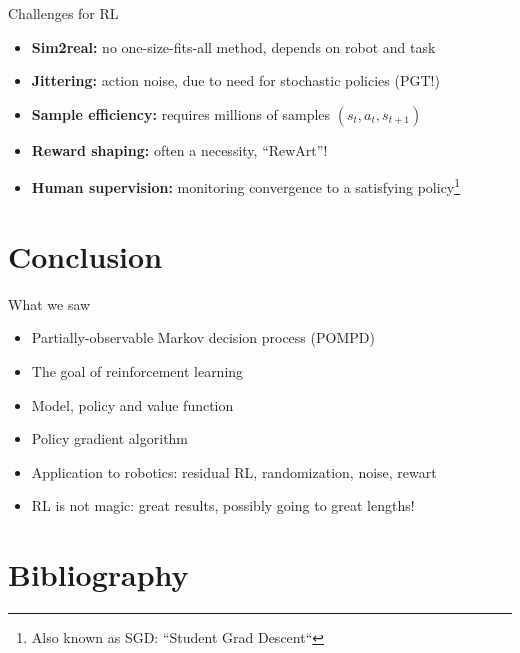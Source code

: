 \documentclass[11pt, aspectratio=169]{beamer}
\begin{document}

\begin{frame}{Challenges for RL}
    \begin{itemize}
        \item \textbf{Sim2real:} no one-size-fits-all method, depends on robot and task
        \item \textbf{Jittering:} action noise, due to need for stochastic policies (PGT!)
        \item \textbf{Sample efficiency:} requires millions of samples $(s_t, a_t, s_{t+1})$
        \item \textbf{Reward shaping:} often a necessity, ``RewArt''!
        \item \textbf{Human supervision:} monitoring convergence to a satisfying policy\footnote{ Also known as SGD: ``Student Grad Descent``}
    \end{itemize}
\end{frame}

\section{Conclusion}

\begin{frame}{What we saw}
    \begin{itemize}
        \item Partially-observable Markov decision process (POMPD)
        \item The goal of reinforcement learning
        \item Model, policy and value function
        \item Policy gradient algorithm
        \item Application to robotics: residual RL, randomization, noise, rewart
        \item RL is not magic: great results, possibly going to great lengths!
    \end{itemize}
\end{frame}

\section*{Bibliography}
\end{document}
